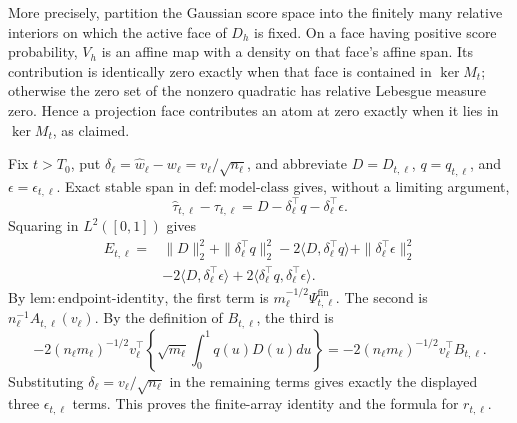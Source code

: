 More precisely, partition the Gaussian score space into the finitely many relative interiors on which the active face of \(D_h\) is fixed.  On a face having positive score probability, \(V_h\) is an affine map with a density on that face's affine span.  Its contribution is identically zero exactly when that face is contained in \(\ker M_t\); otherwise the zero set of the nonzero quadratic has relative Lebesgue measure zero.  Hence a projection face contributes an atom at zero exactly when it lies in \(\ker M_t\), as claimed.

Fix \(t>T_0\), put \(\delta_\ell=\widehat w_\ell-w_\ell=v_\ell/\sqrt{n_\ell}\), and abbreviate \(D=D_{t,\ell}\), \(q=q_{t,\ell}\), and \(\epsilon=\epsilon_{t,\ell}\).  Exact stable span in \(\mathrm{def:model\mbox{-}class}\) gives, without a limiting argument,
\[
 \widehat\tau_{t,\ell}-\tau_{t,\ell}
 =D-\delta_\ell^\top q-\delta_\ell^\top\epsilon.
\]
Squaring in \(L^2([0,1])\) gives
\[
\begin{aligned}
 E_{t,\ell}={}&\|D\|_2^2+\|\delta_\ell^\top q\|_2^2
 -2\langle D,\delta_\ell^\top q\rangle
 +\|\delta_\ell^\top\epsilon\|_2^2\\
 &-2\langle D,\delta_\ell^\top\epsilon\rangle
 +2\langle\delta_\ell^\top q,\delta_\ell^\top\epsilon\rangle.
\end{aligned}
\]
By \(\mathrm{lem:endpoint\mbox{-}identity}\), the first term is
\(m_\ell^{-1/2}\Psi^{\mathrm{fin}}_{t,\ell}\).  The second is
\(n_\ell^{-1}A_{t,\ell}(v_\ell)\).  By the definition of \(B_{t,\ell}\), the third is
\[
 -2(n_\ell m_\ell)^{-1/2}v_\ell^\top
 \left\{\sqrt{m_\ell}\int_0^1q(u)D(u)du\right\}
 =-2(n_\ell m_\ell)^{-1/2}v_\ell^\top B_{t,\ell}.
\]
Substituting \(\delta_\ell=v_\ell/\sqrt{n_\ell}\) in the remaining terms gives exactly the displayed three \(\epsilon_{t,\ell}\) terms.  This proves the finite-array identity and the formula for \(r_{t,\ell}\).

